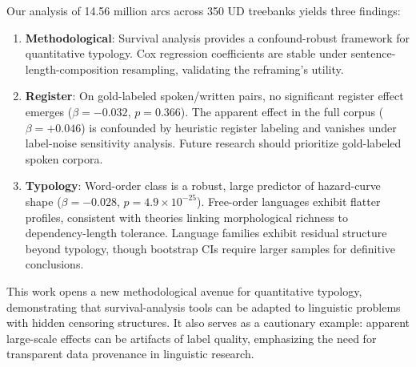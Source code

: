\documentclass[11pt,letterpaper]{article}
\begin{document}
Our analysis of 14.56 million arcs across 350 UD treebanks yields three findings:

\begin{enumerate}
\item \textbf{Methodological}: Survival analysis provides a confound-robust framework for quantitative typology. Cox regression coefficients are stable under sentence-length-composition resampling, validating the reframing's utility.

\item \textbf{Register}: On gold-labeled spoken/written pairs, no significant register effect emerges ($\beta=-0.032$, $p=0.366$). The apparent effect in the full corpus ($\beta=+0.046$) is confounded by heuristic register labeling and vanishes under label-noise sensitivity analysis. Future research should prioritize gold-labeled spoken corpora.

\item \textbf{Typology}: Word-order class is a robust, large predictor of hazard-curve shape ($\beta=-0.028$, $p=4.9\times10^{-25}$). Free-order languages exhibit flatter profiles, consistent with theories linking morphological richness to dependency-length tolerance. Language families exhibit residual structure beyond typology, though bootstrap CIs require larger samples for definitive conclusions.
\end{enumerate}

This work opens a new methodological avenue for quantitative typology, demonstrating that survival-analysis tools can be adapted to linguistic problems with hidden censoring structures. It also serves as a cautionary example: apparent large-scale effects can be artifacts of label quality, emphasizing the need for transparent data provenance in linguistic research.



\end{document}
